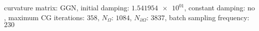 curvature matrix: $\text{GGN}$, initial damping: $\num[scientific-notation=true]{1.541954e+01}$, constant damping: $\text{no}$, maximum CG iterations: $\num[scientific-notation=false]{358}$, $N_{\Omega}$: $\num[scientific-notation=false]{1084}$, $N_{\partial\Omega}$: $\num[scientific-notation=false]{3837}$, batch sampling frequency: $\num[scientific-notation=false]{230}$